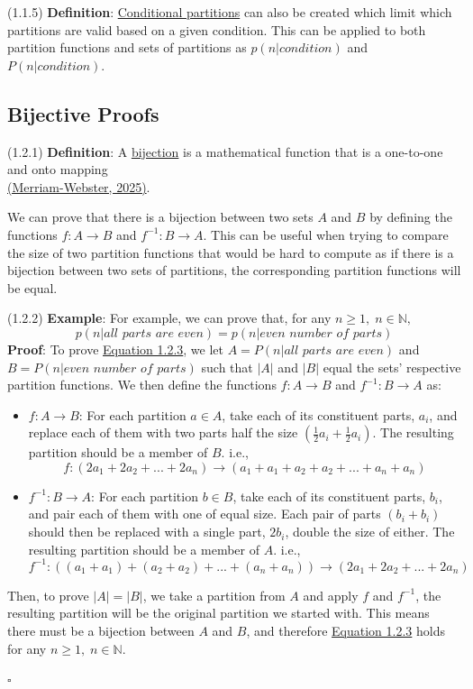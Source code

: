 \documentclass{article}
\newcommand{\separate}[1] {\vspace{#1 pt}\noindent}
\newcommand{\N}{\mathbb{N}}
\newcommand{\definition}[2]{(#1) \textbf{Definition}: #2}
\newcommand{\example}[2]{(#1) \textbf{Example}: #2}
\newcommand{\proof}[1]{\textbf{Proof}: #1 \begin{flushright}\(\square\)\end{flushright}}
\begin{document}
\separate{5}\definition{1.1.5}{\underline{Conditional partitions} can also be created which limit which partitions are valid based on a given condition.} This can be applied to both partition functions and sets of partitions as \(p(n|condition)\) and \(P(n|condition)\).

\subsection{Bijective Proofs}


\definition{1.2.1}{A \underline{bijection} is a mathematical function that is a one-to-one and onto mapping \\ \hyperref[cit:2]{(Merriam-Webster, 2025)}.} 

\separate{5}We can prove that there is a bijection between two sets \(A\) and \(B\) by defining the functions \(f:A \rightarrow B\) and \(f^{-1}: B \rightarrow A\). This can be useful when trying to compare the size of two partition functions that would be hard to compute as if there is a bijection between two sets of partitions, the corresponding partition functions will be equal.

\separate{5}\example{1.2.2}{For example, we can prove that, for any \(n \geq 1, \;n \in \N,\)}\label{ex:1.2.2}
\begin{equation}\tag{1.2.3}\label{equ:1.2.3}
    p(n | \textit{all parts are even}) = p(n | \textit{even number of parts})
\end{equation}
\proof{To prove \hyperref[equ:1.2.3]{Equation 1.2.3}, we let \(A = P(n | \textit{all parts are even})\) and \(B = P(n | \textit{even number of parts})\) such that \(|A|\) and \(|B|\) equal the sets' respective partition functions. We then define the functions \(f:A \rightarrow B\) and \(f^{-1}:B \rightarrow A\) as:

\begin{itemize}
    \item \(f:A \rightarrow B\): For each partition \(a \in A\), take each of its constituent parts, \(a_i\), and replace each of them with two parts half the size \(\left(\frac{1}{2}a_i + \frac{1}{2}a_i\right)\). The resulting partition should be a member of \(B\). i.e.,
    \[f: (2a_1 + 2a_2 + ... + 2a_n) \rightarrow (a_1 + a_1 + a_2 + a_2 + ... + a_n + a_n)\]
    \item \(f^{-1}: B \rightarrow A\): For each partition \(b \in B\), take each of its constituent parts, \(b_i\), and pair each of them with one of equal size. Each pair of parts \((b_i + b_i)\) should then be replaced with a single part, \(2b_i\), double the size of either. The resulting partition should be a member of \(A\). i.e.,
\[f^{-1}: ((a_1 + a_1) + (a_2 + a_2) + ... + (a_n + a_n)) \rightarrow (2a_1 + 2a_2 + ... + 2a_n)\]
\end{itemize}
Then, to prove \(|A| = |B|\), we take a partition from \(A\) and apply \(f\) and \(f^{-1}\), the resulting partition will be the original partition we started with. This means there must be a bijection between \(A\) and \(B\), and therefore \hyperref[equ:1.2.3]{Equation 1.2.3} holds for any \(n \geq 1, \;n \in \N\).}
\end{document}
